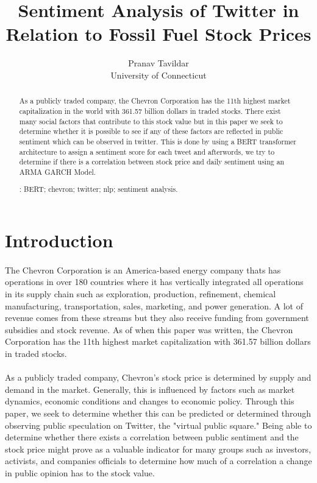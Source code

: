 \documentclass[12pt, letterpaper, titlepage]{article}
\title{Sentiment Analysis of Twitter in Relation to Fossil Fuel Stock Prices}
\author{Pranav Tavildar\\
  University of Connecticut
}
\begin{document}
\maketitle
\doublespace

\begin{abstract}
As a publicly traded company, the Chevron Corporation has the 11th highest market capitalization in the world with 361.57 billion dollars in traded stocks. There exist many social factors that contribute to this stock value but in this paper we seek to determine whether it is possible to see if any of these factors are reflected in public sentiment which can be observed in twitter.  This is done by using a BERT transformer architecture to assign a sentiment score for each tweet and afterwords, we try to determine if there is a correlation between stock price and daily sentiment using an ARMA GARCH Model.

\bigskip
{}:
BERT;
chevron;
twitter;
nlp;
sentiment analysis.

\end{abstract}

\section{Introduction}
\label{sec: intro}
\paragraph{}
	The Chevron Corporation is an America-based energy company thats has operations in over 180 countries where it has vertically integrated all operations in its supply chain such as exploration, production, refinement, chemical manufacturing, transportation, sales, marketing, and power generation. A lot of revenue comes from these streams but they also receive funding from government subsidies and stock revenue. As of when this paper was written, the Chevron Corporation has the 11th highest market capitalization with 361.57 billion dollars in traded stocks.
	\paragraph{}
	As a publicly traded company, Chevron's stock price is determined by supply and demand in the market. Generally, this is influenced by factors such as market dynamics, economic conditions and changes to economic policy. Through this paper, we seek to determine whether this can be predicted or determined through observing public speculation on Twitter, the "virtual public square." Being able to determine whether there exists a correlation between public sentiment and the stock price might prove as a valuable indicator for many groups such as investors, activists, and companies officials to determine how much of a correlation a change in public opinion has to the stock value.  	
\end{document}

